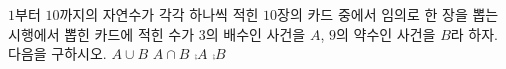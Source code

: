 $1$부터 $10$까지의 자연수가 각각 하나씩 적힌 $10$장의 카드 중에서 임의로 한 장을 뽑는 시행에서 뽑힌 카드에 적힌 수가 $3$의 배수인 사건을 $A$, $9$의 약수인 사건을 $B$라 하자. 다음을 구하시오.
 $A\cup B$
 $A\cap B$
 $\comp{A}$
 $\comp{B}$
